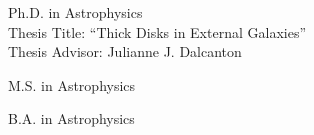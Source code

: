 
Ph.D. in Astrophysics\\
Thesis Title:  ``Thick Disks in External Galaxies''\\
Thesis Advisor:  Julianne J. Dalcanton

M.S. in Astrophysics

B.A. in Astrophysics
